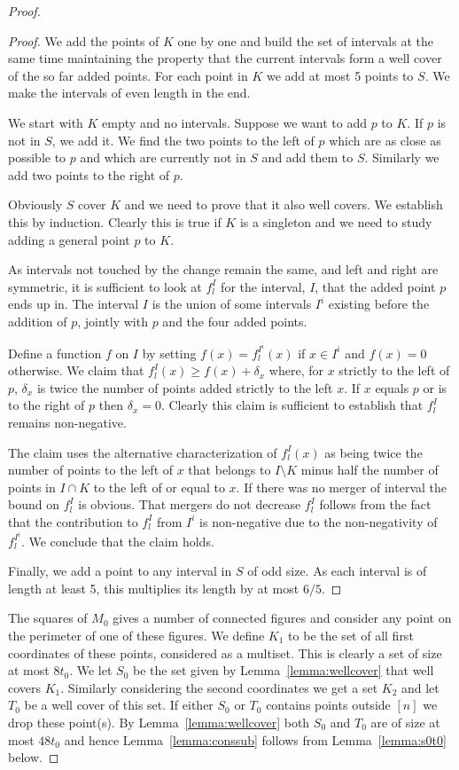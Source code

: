 \documentclass{article}\usepackage[a4paper,margin=20mm]{geometry}
\begin{document}
\begin{proof}
\begin{proof}
We add the points of $K$ one by one and build the set of
intervals at the same time maintaining the
property that the current intervals form a well cover of the
so far added points.  For each point in $K$ we add
at most 5 points to $S$.  We make the intervals of even length
in the end.  

We start with $K$ empty and no intervals.
Suppose we want to add $p$ to $K$.
If $p$ is not in $S$, we add it.  We find the
two points to the left of $p$ which are as close as
possible to $p$ and which are currently not in $S$ and add
them to $S$.  Similarly we add two points to the right of $p$.

Obviously $S$ cover $K$ and we need to prove that it also
well covers.  We establish
this by induction.  Clearly this is true if $K$ is a
singleton and we need to study adding a general point $p$ to $K$.

As intervals not touched by the change remain the same,
and left and right are symmetric, it is sufficient to look
at $f^I_l$ for the interval, $I$, that the added point $p$
ends up in.  The interval $I$ is the union of some
intervals $I^i$ existing before the addition of $p$,
jointly with $p$ and the four added points.

Define a function $f$ on $I$ by setting $f(x)=f_{l}^{I^i}(x)$
if $x\in I^i$ and $f(x)=0$ otherwise.  We claim
that $f_l^I(x) \geq f(x)+\delta_x$ where, for $x$ strictly
to the left of $p$, $\delta_x$ is twice
the number of points added strictly to the left $x$.
If $x$ equals $p$ or is to the right of $p$ then $\delta_x = 0$.
Clearly this claim is sufficient to establish that $f_l^I$ remains non-negative.

The claim uses the alternative characterization of $f^I_l(x)$ as being
twice the number of points to the left of $x$ that belongs to  $I\setminus K$
minus half the number of points in $I \cap K$ to the left of or
equal to $x$.
If there was no merger of interval the bound on $f_l^I$ is obvious.
That mergers do not decrease $f_l^I$ follows from
the fact that the contribution to $f_l^I$ from $I^i$ is non-negative
due to the non-negativity of $f_l^{I^i}$.  We conclude that the
claim holds.

Finally, we add a point to any interval in $S$ of odd
size.  As each interval is of length at least 5,
this multiplies its length by at most $6/5$.
\end{proof}

The squares of $M_0$ gives a number of connected figures
and consider any point on the perimeter of one of these
figures.  We define $K_1$ to be
the set of all first coordinates of these points, considered
as a multiset.  This is clearly a set of size at
most $8t_0$.   We let $S_0$ be the
set given by Lemma~\ref{lemma:wellcover} that well
covers $K_1$.  Similarly considering the second
coordinates we get a set $K_2$ and let $T_0$ be a well cover
of this set.   If either $S_0$ or $T_0$ contains points
outside $[n]$ we drop these point(s).  
By Lemma~\ref{lemma:wellcover} both $S_0$ and $T_0$ are
of size at most $48t_0$ and hence Lemma~\ref{lemma:conssub}
follows from Lemma~\ref{lemma:s0t0} below.
\end{proof}
\end{document}

